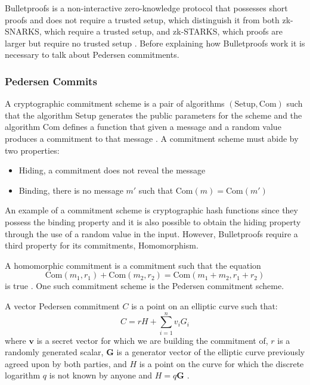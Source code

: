 \documentclass[sigconf,screen,nonacm]{acmart}
\begin{document}
  Bulletproofs is a non-interactive zero-knowledge protocol that possesses short proofs
  and does not require a trusted setup, which distinguish it from both zk-SNARKS, which
  require a trusted setup, and zk-STARKS, which proofs are larger but require
  no trusted setup \cite{Bunz17}. Before explaining how Bulletproofs work it is necessary
  to talk about Pedersen commitments.

  \subsubsection{Pedersen Commits}

  A cryptographic commitment scheme is a pair of algorithms $(\mathrm{Setup},\mathrm{Com})$
  such that the algorithm $\mathrm{Setup}$ generates the public parameters for the scheme
  and the algorithm $\mathrm{Com}$ defines a function that given a message and a random value produces a
  commitment to that message \cite{Bunz17}. A commitment scheme must abide by two properties:
  \begin{itemize}
    \item Hiding, a commitment does not reveal the message \cite{Gibson22}
    \item Binding, there is no message $m'$ such that $\mathrm{Com}(m) = \mathrm{Com}(m')$ \cite{Gibson22, Bunz17}
  \end{itemize}
  An example of a commitment scheme is cryptographic hash functions since they possess the
  binding property and it is also possible to obtain the hiding property through the use of
  a random value in the input. However, Bulletproofs require a third property for its commitments,
  Homomorphism.

  A homomorphic commitment is a commitment such that the equation
  \begin{equation}
    \mathrm{Com}(m_1, r_1) + \mathrm{Com}(m_2,r_2) = \mathrm{Com}(m_1 + m_2, r_1 + r_2)
  \end{equation}
  is true \cite{Bunz17}. One such commitment scheme is the Pedersen commitment scheme.

  A vector Pedersen commitment $C$ is a point on an elliptic curve such that:
  \begin{equation}
    C = rH + \sum_{i=1}^n v_i G_i
  \end{equation}
  where $\mathbf{v}$ is a secret vector for which we are building the commitment of,
  $r$ is a randomly generated scalar, $\mathbf{G}$ is a generator vector of the
  elliptic curve previously agreed upon by both parties, and $H$ is a point on the
  curve for which the discrete logarithm $q$ is not known by anyone and $H = q\mathbf{G}$
  \cite{Gibson22}.
\end{document}
